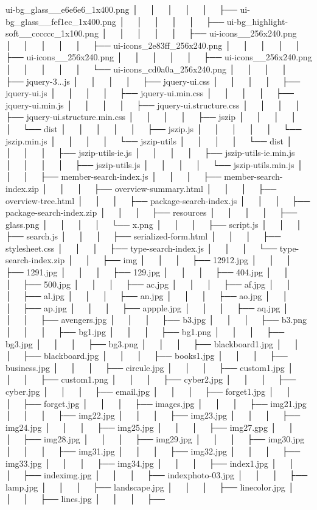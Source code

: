 ui-\/bg\+\_\+glass\+\_\+\_\+e6e6e6\+\_\+1x400.\+png │   │   │   │   │   ├── ui-\/bg\+\_\+glass\+\_\+\_\+fef1ec\+\_\+1x400.\+png │   │   │   │   │   ├── ui-\/bg\+\_\+highlight-\/soft\+\_\+\_\+cccccc\+\_\+1x100.\+png │   │   │   │   │   ├── ui-\/icons\+\_\+\_\+256x240.\+png │   │   │   │   │   ├── ui-\/icons\+\_\+2e83ff\+\_\+256x240.\+png │   │   │   │   │   ├── ui-\/icons\+\_\+\_\+256x240.\+png │   │   │   │   │   ├── ui-\/icons\+\_\+\_\+256x240.\+png │   │   │   │   │   └── ui-\/icons\+\_\+cd0a0a\+\_\+256x240.\+png │   │   │   │   ├── jquery-\/3...\+js │   │   │   │   ├── jquery-\/ui.\+css │   │   │   │   ├── jquery-\/ui.\+js │   │   │   │   ├── jquery-\/ui.\+min.\+css │   │   │   │   ├── jquery-\/ui.\+min.\+js │   │   │   │   ├── jquery-\/ui.\+structure.\+css │   │   │   │   ├── jquery-\/ui.\+structure.\+min.\+css │   │   │   │   ├── jszip │   │   │   │   │   └── dist │   │   │   │   │   ├── jszip.\+js │   │   │   │   │   └── jszip.\+min.\+js │   │   │   │   └── jszip-\/utils │   │   │   │   └── dist │   │   │   │   ├── jszip-\/utils-\/ie.\+js │   │   │   │   ├── jszip-\/utils-\/ie.\+min.\+js │   │   │   │   ├── jszip-\/utils.\+js │   │   │   │   └── jszip-\/utils.\+min.\+js │   │   │   ├── member-\/search-\/index.\+js │   │   │   ├── member-\/search-\/index.\+zip │   │   │   ├── overview-\/summary.\+html │   │   │   ├── overview-\/tree.\+html │   │   │   ├── package-\/search-\/index.\+js │   │   │   ├── package-\/search-\/index.\+zip │   │   │   ├── resources │   │   │   │   ├── glass.\+png │   │   │   │   └── x.\+png │   │   │   ├── script.\+js │   │   │   ├── search.\+js │   │   │   ├── serialized-\/form.\+html │   │   │   ├── stylesheet.\+css │   │   │   ├── type-\/search-\/index.\+js │   │   │   └── type-\/search-\/index.\+zip │   │   ├── img │   │   │   ├── 12912.\+jpg │   │   │   ├── 1291.\+jpg │   │   │   ├── 129.\+jpg │   │   │   ├── 404.\+jpg │   │   │   ├── 500.\+jpg │   │   │   ├── ac.\+jpg │   │   │   ├── af.\+jpg │   │   │   ├── al.\+jpg │   │   │   ├── an.\+jpg │   │   │   ├── ao.\+jpg │   │   │   ├── ap.\+jpg │   │   │   ├── appple.\+jpg │   │   │   ├── aq.\+jpg │   │   │   ├── avengers.\+jpg │   │   │   ├── b3.\+jpg │   │   │   ├── b3.\+png │   │   │   ├── bg1.\+jpg │   │   │   ├── bg1.\+png │   │   │   ├── bg3.\+jpg │   │   │   ├── bg3.\+png │   │   │   ├── blackboard1.\+jpg │   │   │   ├── blackboard.\+jpg │   │   │   ├── books1.\+jpg │   │   │   ├── business.\+jpg │   │   │   ├── circule.\+jpg │   │   │   ├── custom1.\+jpg │   │   │   ├── custom1.\+png │   │   │   ├── cyber2.\+jpg │   │   │   ├── cyber.\+jpg │   │   │   ├── email.\+jpg │   │   │   ├── forget1.\+jpg │   │   │   ├── forget.\+jpg │   │   │   ├── images.\+jpg │   │   │   ├── img21.\+jpg │   │   │   ├── img22.\+jpg │   │   │   ├── img23.\+jpg │   │   │   ├── img24.\+jpg │   │   │   ├── img25.\+jpg │   │   │   ├── img27.\+gpg │   │   │   ├── img28.\+jpg │   │   │   ├── img29.\+jpg │   │   │   ├── img30.\+jpg │   │   │   ├── img31.\+jpg │   │   │   ├── img32.\+jpg │   │   │   ├── img33.\+jpg │   │   │   ├── img34.\+jpg │   │   │   ├── index1.\+jpg │   │   │   ├── indeximg.\+jpg │   │   │   ├── indexphoto-\/03.\+jpg │   │   │   ├── lamp.\+jpg │   │   │   ├── landscape.\+jpg │   │   │   ├── linecolor.\+jpg │   │   │   ├── lines.\+jpg │   │   │   ├── 